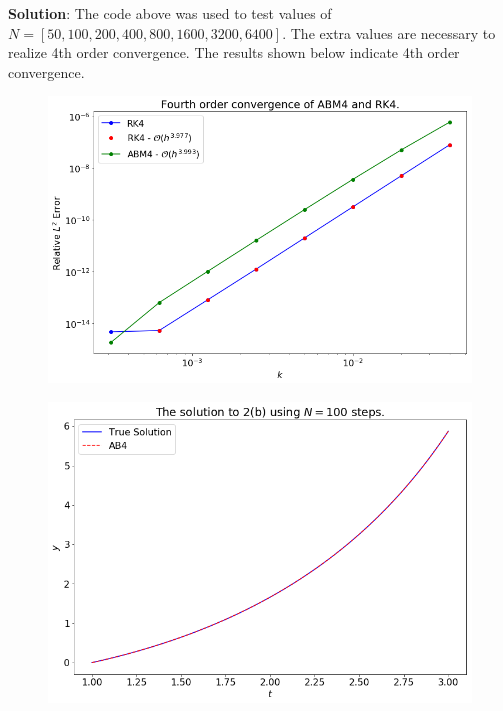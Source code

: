\documentclass[final,oneside,onecolumn]{article}
\begin{document}
\begin{enumerate}
\begin{enumerate}
\bigbreak
{\large \bf Solution}: The code above was used to test values of $N=[50,100,200,400,800, 1600, 3200, 6400]$. The extra values are necessary to realize 4th order convergence. The results shown below indicate 4th order convergence.
\begin{figure}[H]
	\centering
	\includegraphics[width=.8\linewidth]{hw5_2b_convergence}
\end{figure}

\begin{figure}[H]
	\centering
	\includegraphics[width=.8\linewidth]{hw5_2b_plot}
\end{figure}

\end{enumerate}


\end{enumerate}
\end{document}

